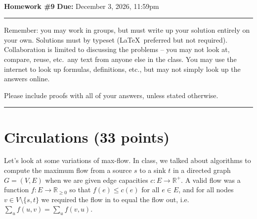\documentclass[11pt]{article}
\begin{document}
\\ 
{{\bf Homework \#9}} \hfill {{\bf Due:} December 3, 2026, 11:59pm} \\
\rule[0.1in]{\textwidth}{0.4pt}

Remember: you may work in groups, but must write up your solution entirely on your own. Solutions must by typeset (\LaTeX\ preferred but not required). 
Collaboration is limited to discussing the problems -- you may not look at, compare, reuse, etc.~any text from anyone else in the class. 
You may use the internet to look up formulas, definitions, etc., but may not simply look up the answers online.  

Please include proofs with all of your answers, unless stated otherwise.


\noindent \rule[0.1in]{\textwidth}{0.4pt}

\section{Circulations (33 points)}

Let's look at some variations of max-flow. In class, we talked about algorithms to compute the maximum flow from a source $s$ to a sink $t$ 
in a directed graph $G= (V, E)$ when we are given edge capacities $c : E \rightarrow \mathbb{R^+}$. A valid flow was a function 
$f : E \rightarrow \mathbb{R}_{\geq 0}$ so that $f(e) \leq c(e)$ for all $e \in E$, and for all nodes $v \in V \setminus\{s,t\}$ 
we required the flow in to equal the flow out, i.e.~$\sum_{u} f(u,v) = \sum_{u} f(v,u)$.
\end{document}
